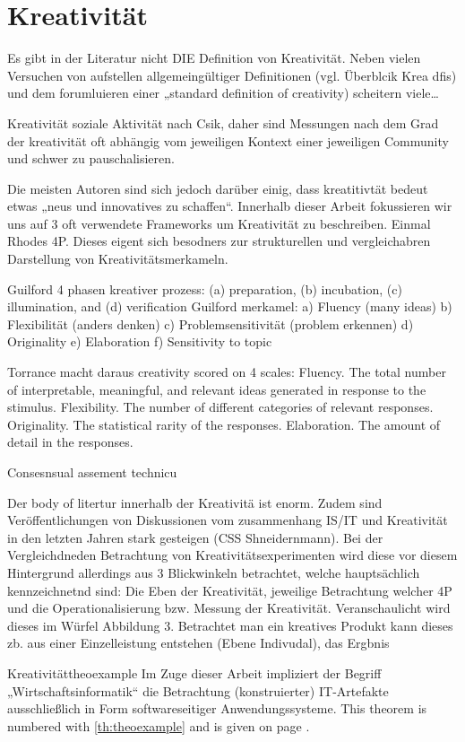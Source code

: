 \section{Kreativität}
Es gibt in der Literatur nicht DIE Definition von Kreativität. Neben vielen Versuchen von aufstellen allgemeingültiger Definitionen (vgl. Überblcik Krea dfis) und dem forumluieren einer „standard definition of creativity) scheitern viele…

Kreativität soziale Aktivität nach Csik, daher sind Messungen nach dem Grad der kreativität oft abhängig vom jeweiligen Kontext einer jeweiligen Community und schwer zu pauschalisieren.

Die meisten Autoren sind sich jedoch darüber einig, dass kreatitivtät bedeut etwas „neus und innovatives zu schaffen“.
Innerhalb dieser Arbeit fokussieren wir uns auf 3 oft verwendete Frameworks um Kreativität zu beschreiben. Einmal Rhodes 4P. Dieses eigent sich besodners zur strukturellen und vergleichabren Darstellung von Kreativitätsmerkameln.

Guilford 4 phasen kreativer prozess: (a) preparation, (b) incubation, (c) illumination, and (d) verification
Guilford merkamel:
a)	Fluency (many ideas)
b)	Flexibilität (anders denken)
c)	Problemsensitivität (problem erkennen)
d)	Originality
e)	Elaboration
f)	Sensitivity to topic

Torrance macht daraus creativity scored on 4 scales:
Fluency. The total number of interpretable, meaningful, and relevant ideas generated in response to the stimulus.
Flexibility. The number of different categories of relevant responses.
Originality. The statistical rarity of the responses.
Elaboration. The amount of detail in the responses.

Consesnsual assement technicu

Der body of litertur innerhalb der Kreativitä ist enorm. Zudem sind Veröffentlichungen von Diskussionen vom zusammenhang IS/IT und Kreativität in den letzten Jahren stark gesteigen (CSS Shneidernmann). Bei der Vergleichdneden Betrachtung von Kreativitätsexperimenten wird diese vor diesem Hintergrund allerdings aus 3 Blickwinkeln betrachtet, welche hauptsächlich kennzeichnetnd sind: Die Eben der Kreativität, jeweilige Betrachtung welcher 4P und die Operationalisierung bzw. Messung der Kreativität. Veranschaulicht wird dieses im Würfel Abbildung 3. Betrachtet man ein kreatives Produkt kann dieses zb. aus einer Einzelleistung entstehen (Ebene Indivudal), das  Ergbnis 

\begin{mytheo}{Kreativität}{theoexample}
  Im Zuge dieser Arbeit impliziert der Begriff „Wirtschaftsinformatik“ die Betrachtung (konstruierter) IT-Artefakte ausschließlich in Form softwareseitiger Anwendungssysteme.
  This theorem is numbered with  \ref{th:theoexample} and is given on page \pageref{th:theoexample}.
\end{mytheo}